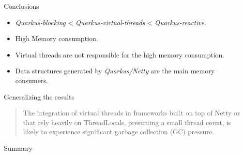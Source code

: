 \documentclass{beamer}
\begin{document}
\begin{frame}{Conclusions}
    \begin{itemize}
        \item \emph{Quarkus-blocking} < \emph{Quarkus-virtual-threads}  < \emph{Quarkus-reactive}.
        \item High Memory consumption.
        \item Virtual threads are not responsible for the high memory consumption.
        \item Data structures generated by \emph{Quarkus/Netty} are the main memory consumers.
    \end{itemize}
\end{frame}
\begin{frame}{Generalizing the results}
    \begin{quote}
        The integration of virtual threads in frameworks built on top of Netty or that rely heavily on ThreadLocals, presuming a small thread count, is likely to experience significant garbage collection (GC) pressure.
    \end{quote}
\end{frame}
\begin{frame}{Summary}
    
\end{frame}
\end{document}
